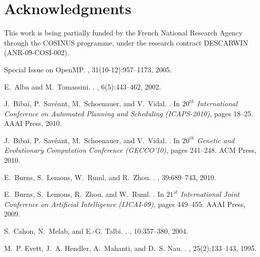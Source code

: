 \documentclass{sig-alternate}
\begin{document}
\section{Acknowledgments}
This work is being partially funded by the French National Research Agency through the COSINUS programme, under the research contract DESCARWIN (ANR-09-COSI-002).


\begin{thebibliography}{10}

{Special Issue on OpenMP}.
, 31(10-12):957--1173, 2005.

E.~Alba and M.~Tomassini.
.
, 6(5):443--462,
  2002.

J.~Biba{\"i}, P.~Sav\'eant, M.~Schoenauer, and V.~Vidal.
.
\newblock In {\em $20^{th}$ International Conference on Automated Planning and
  Scheduling (ICAPS-2010)}, pages 18--25. AAAI Press, 2010.

J.~Biba{\"i}, P.~Sav\'eant, M.~Schoenauer, and V.~Vidal.
.
\newblock In {\em $20^{th}$ Genetic and Evolutionary Computation Conference
  (GECCO'10)}, pages 241--248. ACM Press, 2010.

E.~Burns, S.~Lemons, W.~Ruml, and R.~Zhou.
.
, 39:689--743, 2010.

E.~Burns, S.~Lemons, R.~Zhou, and W.~Ruml.
.
\newblock In {\em $21^{st}$ International Joint Conference on Artificial
  Intelligence (IJCAI-09)}, pages 449--455. AAAI Press, 2009.

S.~Cahon, N.~Melab, and E.-G. Talbi.
.
, 10:357--380, 2004.

M.~P. Evett, J.~A. Hendler, A.~Mahanti, and D.~S. Nau.
.
, 25(2):133--143,
  1995.


\end{thebibliography}
\end{document}

